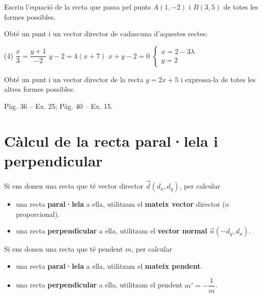 \documentclass[11pt, a4paper, pdf]{article}
\renewcommand{\hot}[1][]{
	\ifthenelse{\equal{#1}{}}{$\mathbf{\bigstar}$ \underline{\textbf{LLIBRE}}: }{\myrepeat{#1}{$\mathbf{\bigstar}$}}
}
\begin{document}
\begin{mylist}
	\item Escriu l'equació de la recta que passa pel punts $A(1,-2)$ i $B(3,5)$ de totes les formes possibles.
	
	\item Obté un punt i un vector director de cadascuna d'aquestes rectes:
	\begin{tasks}(4)
		\task $\dfrac{x}{3}=\dfrac{y+1}{-2}$
		\task $y-2=4(x+7)$
		\task $x+y-2=0$
		\task $\left\{\begin{array}{l} x=2-3\lambda \\ y=2 \end{array}\right.$		
	\end{tasks}
	
	\item Obté un punt i un vector director de la recta $y=2x+5$ i expressa-la de totes les altres formes possibles.
	
 
\end{mylist} 

\hot Pàg. 36 -- Ex. 25; Pàg. 40 -- Ex. 15.
 

\section{Càlcul de la recta paral·lela i perpendicular}
\vspace{-0.25cm}
\begin{theorybox}
	Si ens donen una recta que té vector director $\vec d(d_x, d_y)$, per calcular
	\begin{itemize}
		\item una recta \textbf{paral·lela} a ella, utilitzam el \textbf{mateix vector} director (o proporcional).
		\item una recta \textbf{perpendicular} a ella, utilitzam el \textbf{vector normal}  $\vec n(-d_y, d_x)$.
	\end{itemize}
\end{theorybox}	
\vspace{-0.25cm}

\begin{theorybox}
	Si ens donen una recta que té pendent $m$, per calcular
	\begin{itemize}
		\item una recta \textbf{paral·lela} a ella, utilitzam el \textbf{mateix pendent}.
		\item una recta \textbf{perpendicular} a ella, utilitzam el pendent $m'=-\dfrac{1}{m}$.
	\end{itemize}
\end{theorybox}	
\end{document}
